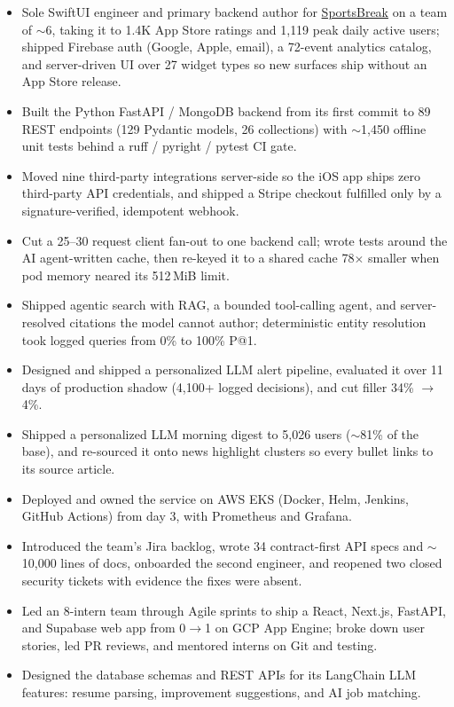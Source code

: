 \documentclass[11pt, letterpaper]{article}
\begin{document}
\begin{itemize}
  \item Sole SwiftUI engineer and primary backend author for \href{https://apps.apple.com/app/id6762649287}{SportsBreak} on a team of $\sim$6, taking it to 1.4K App Store ratings and 1{,}119 peak daily active users; shipped Firebase auth (Google, Apple, email), a 72-event analytics catalog, and server-driven UI over 27 widget types so new surfaces ship without an App Store release.
  \item Built the Python FastAPI / MongoDB backend from its first commit to 89 REST endpoints (129 Pydantic models, 26 collections) with $\sim$1{,}450 offline unit tests behind a ruff / pyright / pytest CI gate.
  \item Moved nine third-party integrations server-side so the iOS app ships zero third-party API credentials, and shipped a Stripe checkout fulfilled only by a signature-verified, idempotent webhook.
  \item Cut a 25--30 request client fan-out to one backend call; wrote tests around the AI agent-written cache, then re-keyed it to a shared cache 78$\times$ smaller when pod memory neared its 512\,MiB limit.
  \item Shipped agentic search with RAG, a bounded tool-calling agent, and server-resolved citations the model cannot author; deterministic entity resolution took logged queries from 0\% to 100\% P@1.
  \item Designed and shipped a personalized LLM alert pipeline, evaluated it over 11 days of production shadow (4{,}100+ logged decisions), and cut filler 34\% $\to$ 4\%.
  \item Shipped a personalized LLM morning digest to 5{,}026 users ($\sim$81\% of the base), and re-sourced it onto news highlight clusters so every bullet links to its source article.
  \item Deployed and owned the service on AWS EKS (Docker, Helm, Jenkins, GitHub Actions) from day 3, with Prometheus and Grafana.
  \item Introduced the team's Jira backlog, wrote 34 contract-first API specs and $\sim$10{,}000 lines of docs, onboarded the second engineer, and reopened two closed security tickets with evidence the fixes were absent.
\end{itemize}

\vspace{1pt}
\begin{itemize}
  \item Led an 8-intern team through Agile sprints to ship a React, Next.js, FastAPI, and Supabase web app from 0$\to$1 on GCP App Engine; broke down user stories, led PR reviews, and mentored interns on Git and testing.
  \item Designed the database schemas and REST APIs for its LangChain LLM features: resume parsing, improvement suggestions, and AI job matching.
\end{itemize}
\end{document}
